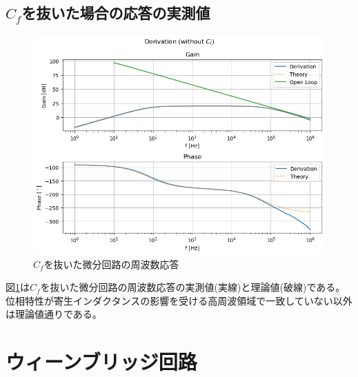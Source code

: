 \documentclass[a4paper]{ltjsarticle}
\begin{document}
\subsection{$C_f$を抜いた場合の応答の実測値}
\begin{figure}[htbp]
    \centering
    \includegraphics[width=0.8\columnwidth]{./images/dervamp3_bode.png}
    \caption{$C_f$を抜いた微分回路の周波数応答}
    \label{fig:dervamp3_bode}
\end{figure}
図\ref{fig:dervamp3_bode}は$C_f$を抜いた微分回路の周波数応答の実測値(実線)と理論値(破線)である。
位相特性が寄生インダクタンスの影響を受ける高周波領域で一致していない以外は理論値通りである。

\section{ウィーンブリッジ回路}
\end{document}
